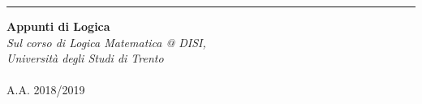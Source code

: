 \documentclass[11pt,a4paper,openany]{memoir}
\theoremstyle{break}\usepackage[italian]{babel}
\theoremstyle{break}
\begin{document}
\begin{titlingpage} %
	
	\raggedleft %
	
	\rule{1pt}{\textheight} %
	\hspace{0.05\textwidth} %
	\parbox[b]{0.75\textwidth}{ 
		{\Huge\bfseries Appunti di Logica}\\[4\baselineskip]
		{\large\textit{Sul corso di Logica Matematica @ DISI,\\ Università degli Studi di Trento}}\\\\
		{\textsc{A.A. 2018/2019}\\[3\baselineskip]
		}
		
		\vspace{0.5\textheight} %
		
	}

\end{titlingpage}









\end{document}
